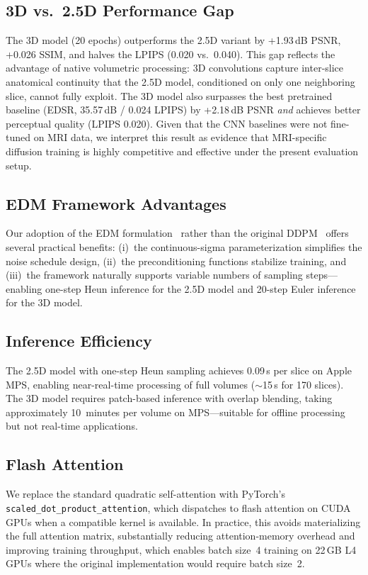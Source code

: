 \documentclass[10pt,journal]{IEEEtran}
\begin{document}
\subsection{3D vs.\ 2.5D Performance Gap}
The 3D model (20 epochs) outperforms the 2.5D variant by +1.93\,dB
PSNR, +0.026 SSIM, and halves the LPIPS (0.020 vs.\ 0.040).  This
gap reflects the advantage of native volumetric processing: 3D
convolutions capture inter-slice anatomical continuity that the 2.5D
model, conditioned on only one neighboring slice, cannot fully exploit.
The 3D model also surpasses the best pretrained baseline (EDSR,
35.57\,dB / 0.024 LPIPS) by +2.18\,dB PSNR \emph{and} achieves
better perceptual quality (LPIPS 0.020).  Given that the CNN baselines
were not fine-tuned on MRI data, we interpret this result as evidence
that MRI-specific diffusion training is highly competitive and effective
under the present evaluation setup.

\subsection{EDM Framework Advantages}
Our adoption of the EDM formulation~\cite{b18} rather than the
original DDPM~\cite{b1} offers several practical benefits:
(i)~the continuous-sigma parameterization simplifies the noise
schedule design, (ii)~the preconditioning functions stabilize
training, and (iii)~the framework naturally supports variable numbers
of sampling steps---enabling one-step Heun inference for the 2.5D
model and 20-step Euler inference for the 3D model.

\subsection{Inference Efficiency}
The 2.5D model with one-step Heun sampling achieves 0.09\,s per
slice on Apple MPS, enabling near-real-time processing of full volumes
($\sim$15\,s for 170 slices).  The 3D model requires patch-based
inference with overlap blending, taking approximately 10~minutes per
volume on MPS---suitable for offline processing but not real-time
applications.

\subsection{Flash Attention}
We replace the standard quadratic self-attention with PyTorch's
\texttt{scaled\_dot\_product\_attention}, which dispatches to flash
attention on CUDA GPUs when a compatible kernel is available.  In
practice, this avoids materializing the full attention matrix,
substantially reducing attention-memory overhead and improving training
throughput, which enables batch size~4 training on 22\,GB L4 GPUs where the original
implementation would require batch size~2.
\end{document}
